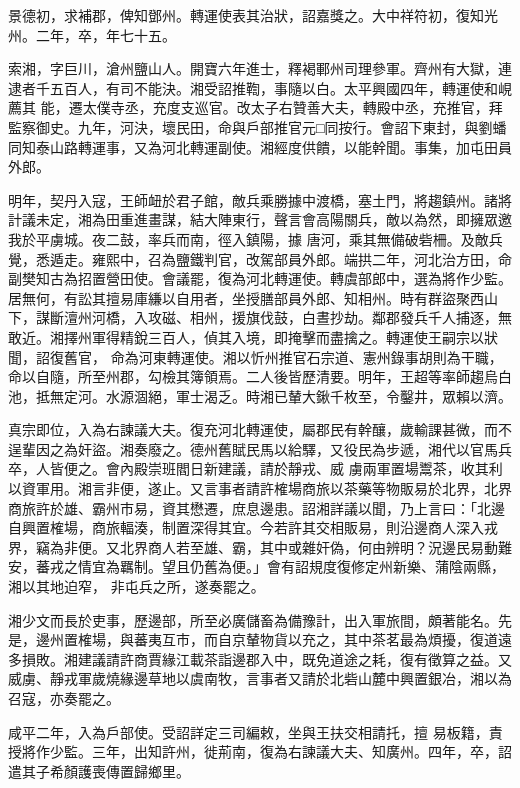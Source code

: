 \begin{pinyinscope}
 景德初，求補郡，俾知鄧州。轉運使表其治狀，詔嘉獎之。大中祥符初，復知光州。二年，卒，年七十五。



 索湘，字巨川，滄州鹽山人。開寶六年進士，釋褐鄆州司理參軍。齊州有大獄，連逮者千五百人，有司不能決。湘受詔推鞫，事隨以白。太平興國四年，轉運使和峴薦其
 能，遷太僕寺丞，充度支巡官。改太子右贊善大夫，轉殿中丞，充推官，拜監察御史。九年，河決，壞民田，命與戶部推官元□同按行。會詔下東封，與劉蟠同知泰山路轉運事，又為河北轉運副使。湘經度供饋，以能幹聞。事集，加屯田員外郎。



 明年，契丹入寇，王師衄於君子館，敵兵乘勝據中渡橋，塞土門，將趨鎮州。諸將計議未定，湘為田重進畫謀，結大陣東行，聲言會高陽關兵，敵以為然，即擁眾邀我於平虜城。夜二鼓，率兵而南，徑入鎮陽，據
 唐河，乘其無備破砦柵。及敵兵覺，悉遁走。雍熙中，召為鹽鐵判官，改駕部員外郎。端拱二年，河北治方田，命副樊知古為招置營田使。會議罷，復為河北轉運使。轉虞部郎中，選為將作少監。居無何，有訟其擅易庫縑以自用者，坐授膳部員外郎、知相州。時有群盜聚西山下，謀斷澶州河橋，入攻磁、相州，援旗伐鼓，白晝抄劫。鄰郡發兵千人捕逐，無敢近。湘擇州軍得精銳三百人，偵其入境，即掩擊而盡擒之。轉運使王嗣宗以狀聞，詔復舊官，
 命為河東轉運使。湘以忻州推官石宗道、憲州錄事胡則為干職，命以自隨，所至州郡，勾檢其簿領焉。二人後皆歷清要。明年，王超等率師趨烏白池，抵無定河。水源涸絕，軍士渴乏。時湘已輦大鍬千枚至，令鑿井，眾賴以濟。



 真宗即位，入為右諫議大夫。復充河北轉運使，屬郡民有幹釀，歲輸課甚微，而不逞輩因之為奸盜。湘奏廢之。德州舊賦民馬以給驛，又役民為步遞，湘代以官馬兵卒，人皆便之。會內殿崇班閻日新建議，請於靜戎、威
 虜兩軍置場鬻茶，收其利以資軍用。湘言非便，遂止。又言事者請許榷場商旅以茶藥等物販易於北界，北界商旅許於雄、霸州市易，資其懋遷，庶息邊患。詔湘詳議以聞，乃上言曰：「北邊自興置榷場，商旅輻湊，制置深得其宜。今若許其交相販易，則沿邊商人深入戎界，竊為非便。又北界商人若至雄、霸，其中或雜奸偽，何由辨明？況邊民易動難安，蕃戎之情宜為羈制。望且仍舊為便。」會有詔規度復修定州新樂、蒲陰兩縣，湘以其地迫窄，
 非屯兵之所，遂奏罷之。



 湘少文而長於吏事，歷邊部，所至必廣儲畜為備豫計，出入軍旅間，頗著能名。先是，邊州置榷場，與蕃夷互市，而自京輦物貨以充之，其中茶茗最為煩擾，復道遠多損敗。湘建議請許商賈緣江載茶詣邊郡入中，既免道途之耗，復有徵算之益。又威虜、靜戎軍歲燒緣邊草地以虞南牧，言事者又請於北砦山麓中興置銀冶，湘以為召寇，亦奏罷之。



 咸平二年，入為戶部使。受詔詳定三司編敕，坐與王扶交相請托，擅
 易板籍，責授將作少監。三年，出知許州，徙荊南，復為右諫議大夫、知廣州。四年，卒，詔遣其子希顏護喪傳置歸鄉里。




\end{pinyinscope}
